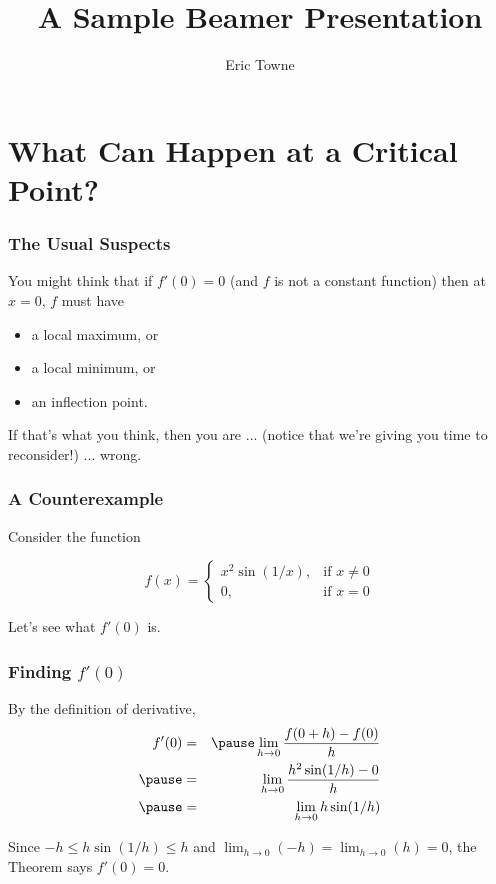 \documentclass{beamer} %
\title{A Sample Beamer Presentation}
\author{Eric Towne}
\institute{Bates College}
\theoremstyle{definition} %
\begin{document}
\begin{frame} 
\titlepage
\end{frame}

\section{What Can Happen at a Critical Point?} %

\begin{frame} 
\frametitle{The Usual Suspects}

You might think that if $f'(0)=0$ (and $f$ is not a constant function) then at $x=0$, $f$ must have

\begin{itemize}
\pause \item a local maximum, or %
\pause \item a local minimum, or
\pause \item an inflection point.
\end{itemize}  

\pause If that's what you think, then you are ... \pause (notice that we're giving you time to reconsider!) ... \pause wrong.

\end{frame}

\begin{frame}
\frametitle{A Counterexample}

Consider the function 

$$ f(x)=
\begin{cases} %
x^2\sin(1/x), &\text{if }x\neq0 \\
0, &\text{if }x=0
\end{cases}
$$

Let's see what $f'(0)$ is.

\end{frame}

\begin{frame}
\frametitle{Finding $f'(0)$}

By the definition of derivative,
\begin{eqnarray*} %
f'(0)&=&\pause\displaystyle\lim_{h\to 0}\frac{f(0+h)-f(0)}{h}\\
\pause&=&\displaystyle\lim_{h\to 0}\frac{h^2\sin(1/h)-0}{h}\\
\pause&=&\displaystyle\lim_{h\to 0}h\sin(1/h)\\
\end{eqnarray*}

Since $-h\leq h\sin(1/h)\leq h$ \pause and $\displaystyle\lim_{h\to 0}(-h)=\displaystyle\lim_{h\to 0}(h)=0$, \pause the Theorem says \pause $f'(0)=0.$
\end{frame}
\end{document}
